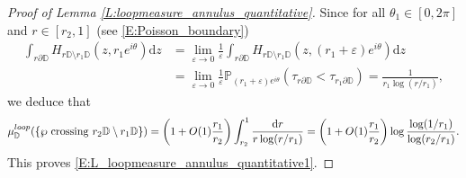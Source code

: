 \documentclass[11pt]{article}
\theoremstyle{remark}
\newcommand{\D}{\mathbb{D}}
\newcommand{\PROB}[2]{\mathbb{P}_{#1} \left( #2 \right) }
\newcommand{\eps}{\varepsilon}
\renewcommand{\d}{\mathrm{d}}
\def \loopmeasure{\mu^{\rm loop}}
\numberwithin{equation}{section}
\begin{document}
\begin{proof}[Proof of Lemma \ref{L:loopmeasure_annulus_quantitative}]
Since for all $\theta_1 \in [0,2\pi]$ and $r \in [r_2,1]$ (see \eqref{E:Poisson_boundary})
\begin{align}
\label{E:proof_Poisson_disc3}
\int_{r \partial \D} H_{r \D \setminus r_1 \D}(z,r_1 e^{i\theta}) \d z
& = \lim_{\eps \to 0} \frac{1}{\eps} \int_{r \partial \D} H_{r \D \setminus r_1 \D}(z,(r_1 + \eps) e^{i\theta}) \d z \\
& = \lim_{\eps \to 0} \frac{1}{\eps} \PROB{(r_1 + \eps) e^{i\theta}}{ \tau_{r \partial \D} < \tau_{r_1 \partial \D} }
= \frac{1}{r_1 \log(r/r_1)},
\nonumber
\end{align}
we deduce that
\begin{align*}
\loopmeasure_\D ( \{ \wp \mathrm{~crossing~} r_2 \D \setminus r_1 \D \} )
= \left( 1 + O(1)\frac{r_1}{r_2} \right) \int_{r_2}^1 \frac{\d r}{r \log(r/r_1)}
= \left( 1 + O(1)\frac{r_1}{r_2} \right) \log \frac{\log(1/r_1)}{\log(r_2/r_1)}.
\end{align*}
This proves \eqref{E:L_loopmeasure_annulus_quantitative1}.



\end{proof}
\end{document}

